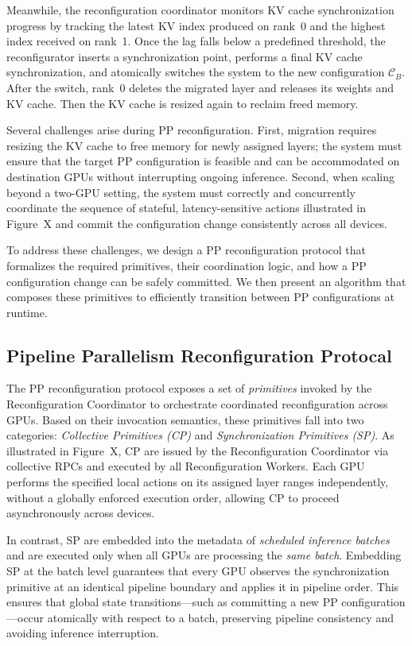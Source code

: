 \documentclass[sigplan,screen]{acmart}
\begin{document}
Meanwhile, the reconfiguration coordinator monitors KV cache synchronization progress by tracking the latest KV index produced on rank~0 and the highest index received on rank~1. Once the lag falls below a predefined threshold, the reconfigurator inserts a synchronization point, performs a final KV cache synchronization, and atomically switches the system to the new configuration $\mathcal{C}_B$. After the switch, rank~0 deletes the migrated layer and releases its weights and KV cache. Then the KV cache is resized again to reclaim freed memory.

Several challenges arise during PP reconfiguration. First, migration requires resizing the KV cache to free memory for newly assigned layers; the system must ensure that the target PP configuration is feasible and can be accommodated on destination GPUs without interrupting ongoing inference. Second, when scaling beyond a two-GPU setting, the system must correctly and concurrently coordinate the sequence of stateful, latency-sensitive actions illustrated in Figure~X and commit the configuration change consistently across all devices.


To address these challenges, we design a PP reconfiguration protocol that formalizes the required primitives, their coordination logic, and how a PP configuration change can be safely committed. We then present an algorithm that composes these primitives to efficiently transition between PP configurations at runtime.

\subsection{Pipeline Parallelism Reconfiguration Protocal}

The PP reconfiguration protocol exposes a set of \emph{primitives} invoked by the Reconfiguration Coordinator to orchestrate coordinated reconfiguration across GPUs. Based on their invocation semantics, these primitives fall into two categories: \emph{Collective Primitives (CP)} and \emph{Synchronization Primitives (SP)}. As illustrated in Figure~X, CP are issued by the Reconfiguration Coordinator via collective RPCs and executed by all Reconfiguration Workers. Each GPU performs the specified local actions on its assigned layer ranges independently, without a globally enforced execution order, allowing CP to proceed asynchronously across devices.

In contrast, SP are embedded into the metadata of \emph{scheduled inference batches} and are executed only when all GPUs are processing the \emph{same batch}. Embedding SP at the batch level guarantees that every GPU observes the synchronization primitive at an identical pipeline boundary and applies it in pipeline order. This ensures that global state transitions—such as committing a new PP configuration—occur atomically with respect to a batch, preserving pipeline consistency and avoiding inference interruption.
\end{document}
